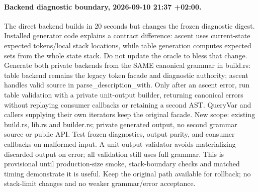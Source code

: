 \documentclass[11pt,a4paper]{article}
\begin{document}
\paragraph{Backend diagnostic boundary, 2026-09-10 21:37 +02:00.}
The direct backend builds in 20 seconds but changes the frozen diagnostic digest.
Installed generator code explains a contract difference: ascent uses current-state
expected tokens/local stack locations, while table generation computes expected
sets from the whole state stack. Do not update the oracle to bless that change.
Generate both private backends from the SAME canonical grammar in build.rs:
table backend remains the legacy token facade and diagnostic authority; ascent
handles valid source in parse\_description\_with. Only after an ascent error,
run table validation with a private unit-output builder, returning canonical
errors without replaying consumer callbacks or retaining a second AST. QueryVar
and callers supplying their own iterators keep the original facade.
New scope: existing build.rs, lib.rs and builder.rs; private generated output,
no second grammar source or public API. Test frozen diagnostics, output parity,
and consumer callbacks on malformed input. A unit-output validator avoids
materializing discarded output on error; all validation still uses full grammar.
This is provisional until production-size smoke, stack-boundary checks and
matched timing demonstrate it is useful. Keep the original path available for
rollback; no stack-limit changes and no weaker grammar/error acceptance.
\end{document}
